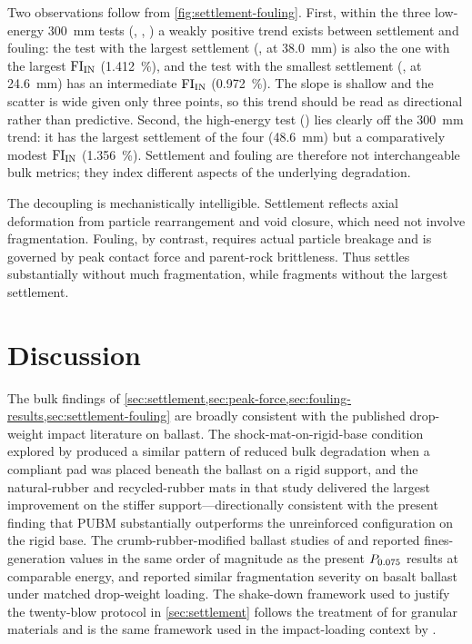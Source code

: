 Two observations follow from \cref{fig:settlement-fouling}. First, within the three low-energy \qty{300}{\mm} tests (, , ) a weakly positive trend exists between settlement and fouling: the test with the largest settlement (,  at \qty{38.0}{\mm}) is also the one with the largest $\mathrm{FI}_{\mathrm{IN}}$ (\qty{1.412}{\percent}), and the test with the smallest settlement (,  at \qty{24.6}{\mm}) has an intermediate $\mathrm{FI}_{\mathrm{IN}}$ (\qty{0.972}{\percent}). The slope is shallow and the scatter is wide given only three points, so this trend should be read as directional rather than predictive. Second, the high-energy test  () lies clearly off the \qty{300}{\mm} trend: it has the largest settlement of the four (\qty{48.6}{\mm}) but a comparatively modest $\mathrm{FI}_{\mathrm{IN}}$ (\qty{1.356}{\percent}). Settlement and fouling are therefore not interchangeable bulk metrics; they index different aspects of the underlying degradation.

The decoupling is mechanistically intelligible. Settlement reflects axial deformation from particle rearrangement and void closure, which need not involve fragmentation. Fouling, by contrast, requires actual particle breakage and is governed by peak contact force and parent-rock brittleness. Thus  settles substantially without much fragmentation, while  fragments without the largest settlement.

\section{Discussion}
\label{sec:impact-discussion}

The bulk findings of \cref{sec:settlement,sec:peak-force,sec:fouling-results,sec:settlement-fouling} are broadly consistent with the published drop-weight impact literature on ballast. The shock-mat-on-rigid-base condition explored by \citet{nimbalkar2012} produced a similar pattern of reduced bulk degradation when a compliant pad was placed beneath the ballast on a rigid support, and the natural-rubber and recycled-rubber mats in that study delivered the largest improvement on the stiffer support---directionally consistent with the present finding that PUBM substantially outperforms the unreinforced configuration on the rigid base. The crumb-rubber-modified ballast studies of \citet{koohmishi2021,koohmishi2022} and \citet{zhang2023} reported fines-generation values in the same order of magnitude as the present $P_{0.075}$ results at comparable energy, and \citet{koohmishi2020} reported similar fragmentation severity on basalt ballast under matched drop-weight loading. The shake-down framework used to justify the twenty-blow protocol in \cref{sec:settlement} follows the treatment of \citet{werkmeister2001} for granular materials and is the same framework used in the impact-loading context by \citet{nimbalkar2012}.

